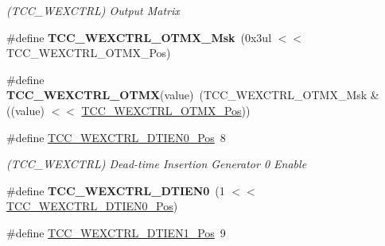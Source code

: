 \begin{DoxyCompactItemize}
\begin{DoxyCompactList}\small\item\em (T\+C\+C\+\_\+\+W\+E\+X\+C\+T\+R\+L) Output Matrix \end{DoxyCompactList}\item 
\hypertarget{group___s_a_m_l21___t_c_c_ga9283f9e2f3cd02f17030a8bd0df98d41}{}\#define {\bfseries T\+C\+C\+\_\+\+W\+E\+X\+C\+T\+R\+L\+\_\+\+O\+T\+M\+X\+\_\+\+Msk}~(0x3ul $<$$<$ T\+C\+C\+\_\+\+W\+E\+X\+C\+T\+R\+L\+\_\+\+O\+T\+M\+X\+\_\+\+Pos)\label{group___s_a_m_l21___t_c_c_ga9283f9e2f3cd02f17030a8bd0df98d41}

\item 
\hypertarget{group___s_a_m_l21___t_c_c_ga89a50c12f45b107a5c099dfb88bb9484}{}\#define {\bfseries T\+C\+C\+\_\+\+W\+E\+X\+C\+T\+R\+L\+\_\+\+O\+T\+M\+X}(value)~(T\+C\+C\+\_\+\+W\+E\+X\+C\+T\+R\+L\+\_\+\+O\+T\+M\+X\+\_\+\+Msk \& ((value) $<$$<$ \hyperlink{group___s_a_m_l21___t_c_c_gaf2eb4848370cc8e8d3fd8823bc871d2c}{T\+C\+C\+\_\+\+W\+E\+X\+C\+T\+R\+L\+\_\+\+O\+T\+M\+X\+\_\+\+Pos}))\label{group___s_a_m_l21___t_c_c_ga89a50c12f45b107a5c099dfb88bb9484}

\item 
\hypertarget{group___s_a_m_l21___t_c_c_ga70625aa00680e49ba20de10bc7f8b34e}{}\#define \hyperlink{group___s_a_m_l21___t_c_c_ga70625aa00680e49ba20de10bc7f8b34e}{T\+C\+C\+\_\+\+W\+E\+X\+C\+T\+R\+L\+\_\+\+D\+T\+I\+E\+N0\+\_\+\+Pos}~8\label{group___s_a_m_l21___t_c_c_ga70625aa00680e49ba20de10bc7f8b34e}

\begin{DoxyCompactList}\small\item\em (T\+C\+C\+\_\+\+W\+E\+X\+C\+T\+R\+L) Dead-\/time Insertion Generator 0 Enable \end{DoxyCompactList}\item 
\hypertarget{group___s_a_m_l21___t_c_c_ga5d6fc38be5ae7a24b0cf088a09bba6e9}{}\#define {\bfseries T\+C\+C\+\_\+\+W\+E\+X\+C\+T\+R\+L\+\_\+\+D\+T\+I\+E\+N0}~(1 $<$$<$ \hyperlink{group___s_a_m_l21___t_c_c_ga70625aa00680e49ba20de10bc7f8b34e}{T\+C\+C\+\_\+\+W\+E\+X\+C\+T\+R\+L\+\_\+\+D\+T\+I\+E\+N0\+\_\+\+Pos})\label{group___s_a_m_l21___t_c_c_ga5d6fc38be5ae7a24b0cf088a09bba6e9}

\item 
\hypertarget{group___s_a_m_l21___t_c_c_ga682056b1480c2f8d0de0440e565198ba}{}\#define \hyperlink{group___s_a_m_l21___t_c_c_ga682056b1480c2f8d0de0440e565198ba}{T\+C\+C\+\_\+\+W\+E\+X\+C\+T\+R\+L\+\_\+\+D\+T\+I\+E\+N1\+\_\+\+Pos}~9\label{group___s_a_m_l21___t_c_c_ga682056b1480c2f8d0de0440e565198ba}


\end{DoxyCompactItemize}
